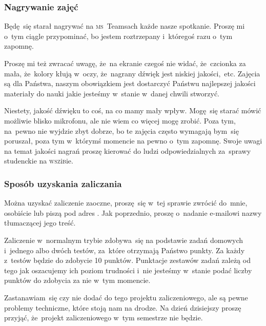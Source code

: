 \documentclass[10pt,t]{beamer}
\begin{document}
\begin{frame}
  \frametitle{Nagrywanie zajęć}


  Będę~się starał nagrywać na \textsc{ms}~Teamsach każde nasze spotkanie.
  Proszę mi o~tym ciągle przypominać, bo jestem roztrzepany i~któregoś
  razu o~tym zapomnę.

  Proszę mi też zwracać uwagę, że~na ekranie czegoś nie widać,
  że~czcionka za mała, że~kolory kłują w~oczy, że~nagrany dźwięk
  jest niskiej jakości,~etc. Zajęcia są dla Państwa, naszym obowiązkiem jest
  dostarczyć Państwu najlepszej jakości materiały do nauki jakie jesteśmy
  w~stanie w~danej chwili stworzyć.

  Niestety, jakość dźwięku to coś, na co mamy mały wpływ. Mogę~się starać
  mówić możliwie blisko mikrofonu, ale nie wiem co więcej mogę zrobić.
  Poza tym, na~pewno nie wyjdzie zbyt dobrze, bo te zajęcia często wymagają
  bym~się poruszał, poza tym w~którymś momencie na pewno o~tym zapomnę.
  Swoje uwagi na temat jakości nagrań proszę kierować do ludzi
  odpowiedzialnych za~sprawy studenckie na \textsc{wsz}i\textsc{b}ie.

\end{frame}





\begin{frame}
  \frametitle{Sposób uzyskania zaliczania}


  Można uzyskać zaliczenie zaoczne, proszę~się w~tej sprawie zwrócić
  do~mnie, osobiście lub piszą pod adres \email. Jak poprzednio, proszę
  o~nadanie e-mailowi nazwy tłumaczącej jego treść.

  Zaliczenie w~normalnym trybie zdobywa~się na podstawie zadań domowych
  i~jednego albo dwóch testów, za~które otrzymają Państwo punkty. Za każdy
  z~testów będzie do zdobycie 10 punktów. Punktacje zestawów zadań zależą
  od tego jak oszacujemy ich poziom trudności i~nie jesteśmy w~stanie podać
  liczby punktów do zdobycia za nie w~tym momencie.

  Zastanawiam~się czy nie dodać do tego projektu zaliczeniowego, ale są
  pewne problemy techniczne, które stoją nam na drodze. Na dzień dzisiejszy
  proszę przyjąć, że~projekt zaliczeniowego w~tym semestrze nie będzie.

\end{frame}
\end{document}
